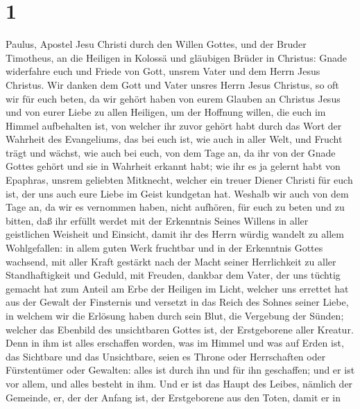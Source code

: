 \hypertarget{section}{%
\section{1}\label{section}}

 Paulus, Apostel Jesu Christi durch den Willen Gottes, und
der Bruder Timotheus,  an die Heiligen in Kolossä und
gläubigen Brüder in Christus: Gnade widerfahre euch und Friede von Gott,
unsrem Vater und dem Herrn Jesus Christus.  Wir danken dem
Gott und Vater unsres Herrn Jesus Christus, so oft wir für euch beten,
 da wir gehört haben von eurem Glauben an Christus Jesus
und von eurer Liebe zu allen Heiligen,  um der Hoffnung
willen, die euch im Himmel aufbehalten ist, von welcher ihr zuvor gehört
habt durch das Wort der Wahrheit des Evangeliums,  das bei
euch ist, wie auch in aller Welt, und Frucht trägt und wächst, wie auch
bei euch, von dem Tage an, da ihr von der Gnade Gottes gehört und sie in
Wahrheit erkannt habt;  wie ihr es ja gelernt habt von
Epaphras, unsrem geliebten Mitknecht, welcher ein treuer Diener Christi
für euch ist,  der uns auch eure Liebe im Geist kundgetan
hat.  Weshalb wir auch von dem Tage an, da wir es
vernommen haben, nicht aufhören, für euch zu beten und zu bitten, daß
ihr erfüllt werdet mit der Erkenntnis Seines Willens in aller
geistlichen Weisheit und Einsicht,  damit ihr des Herrn
würdig wandelt zu allem Wohlgefallen: in allem guten Werk fruchtbar und
in der Erkenntnis Gottes wachsend,  mit aller Kraft
gestärkt nach der Macht seiner Herrlichkeit zu aller Standhaftigkeit und
Geduld, mit Freuden,  dankbar dem Vater, der uns tüchtig
gemacht hat zum Anteil am Erbe der Heiligen im Licht, 
welcher uns errettet hat aus der Gewalt der Finsternis und versetzt in
das Reich des Sohnes seiner Liebe,  in welchem wir die
Erlösung haben durch sein Blut, die Vergebung der Sünden;
 welcher das Ebenbild des unsichtbaren Gottes ist, der
Erstgeborene aller Kreatur.  Denn in ihm ist alles
erschaffen worden, was im Himmel und was auf Erden ist, das Sichtbare
und das Unsichtbare, seien es Throne oder Herrschaften oder Fürstentümer
oder Gewalten: alles ist durch ihn und für ihn geschaffen;
 und er ist vor allem, und alles besteht in ihm.
 Und er ist das Haupt des Leibes, nämlich der Gemeinde,
er, der der Anfang ist, der Erstgeborene aus den Toten, damit er in
